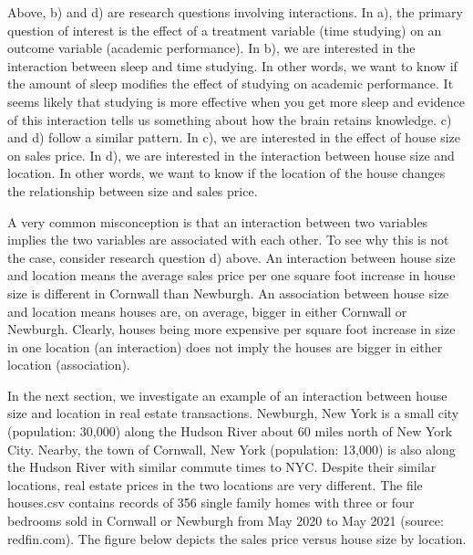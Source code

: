 \documentclass[
]{book}
\begin{document}
Above, b) and d) are research questions involving interactions. In a), the primary question of interest is the effect of a treatment variable (time studying) on an outcome variable (academic performance). In b), we are interested in the interaction between sleep and time studying. In other words, we want to know if the amount of sleep modifies the effect of studying on academic performance. It seems likely that studying is more effective when you get more sleep and evidence of this interaction tells us something about how the brain retains knowledge. c) and d) follow a similar pattern. In c), we are interested in the effect of house size on sales price. In d), we are interested in the interaction between house size and location. In other words, we want to know if the location of the house changes the relationship between size and sales price.

A very common misconception is that an interaction between two variables implies the two variables are associated with each other. To see why this is not the case, consider research question d) above. An interaction between house size and location means the average sales price per one square foot increase in house size is different in Cornwall than Newburgh. An association between house size and location means houses are, on average, bigger in either Cornwall or Newburgh. Clearly, houses being more expensive per square foot increase in size in one location (an interaction) does not imply the houses are bigger in either location (association).

In the next section, we investigate an example of an interaction between house size and location in real estate transactions. Newburgh, New York is a small city (population: 30,000) along the Hudson River about 60 miles north of New York City. Nearby, the town of Cornwall, New York (population: 13,000) is also along the Hudson River with similar commute times to NYC. Despite their similar locations, real estate prices in the two locations are very different. The file houses.csv contains records of 356 single family homes with three or four bedrooms sold in Cornwall or Newburgh from May 2020 to May 2021 (source: redfin.com). The figure below depicts the sales price versus house size by location.
\end{document}
